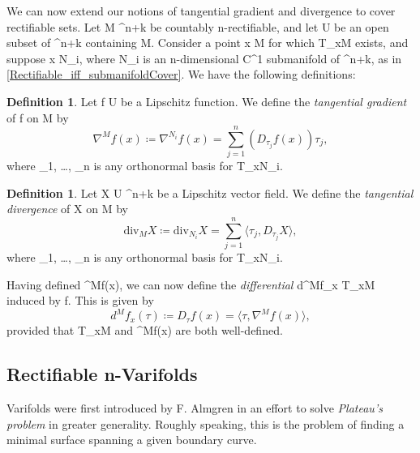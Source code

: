 \documentclass[a4paper, 11pt]{article}
\theoremstyle{plain}
\theoremstyle{definition}
\newtheorem{definition}[theorem]{Definition}
\theoremstyle{remark}
\renewcommand{\div}{\text{div}} %
\numberwithin{equation}{subsection}
\def\({}
\def\){}
\begin{document}
We can now extend our notions of tangential gradient and divergence to cover rectifiable sets. Let \(M \subset {}^{n+k}\) be countably \(n\)-rectifiable, and let \(U\) be an open subset of \(^{n+k}\) containing \(M\). Consider a point \(x \in M\) for which \(T_{x}M\) exists, and suppose \(x \in N_{i}\), where \(N_{i}\) is an \(n\)-dimensional \(C^1\) submanifold of \(^{n+k}\), as in \cref{Rectifiable_iff_submanifoldCover}. We have the following definitions:

\begin{definition}
Let \(f \vcentcolon U \rightarrow {}\) be a Lipschitz function. We define the \emph{tangential gradient} of \(f\) on \(M\) by
\begin{equation}
\nabla^{M}f(x) \coloneq \nabla^{N_i}f(x) = \sum_{j=1}^{n}(D_{\tau_{j}}f(x))\tau_{j},
\end{equation}
where \(\tau_{1}, \ldots, \tau_{n}\) is any orthonormal basis for \(T_{x}N_{i}\).
\end{definition}

\begin{definition}
Let \(X \vcentcolon U \rightarrow {}^{n+k}\) be a Lipschitz vector field. We define the \emph{tangential divergence} of \(X\) on \(M\) by
\begin{equation}
\div_{M}X \coloneq \div_{N_i}X = \sum_{j=1}^{n} \langle \tau_{j}, D_{\tau_{j}}X \rangle,
\end{equation}
where \(\tau_{1}, \ldots, \tau_{n}\) is any orthonormal basis for \(T_{x}N_{i}\). 
\end{definition}

Having defined \(\nabla^{M}f(x)\), we can now define the \emph{differential} \(d^{M}f_{x} \vcentcolon T_{x}M \rightarrow {}\) induced by \(f\). This is given by
\begin{equation}
d^{M}f_{x}(\tau) \coloneq D_{\tau}f(x) = \langle \tau, \nabla^{M}f(x) \rangle,
\end{equation}
provided that \(T_{x}M\) and \(\nabla^{M}f(x)\) are both well-defined.

\subsection{Rectifiable \(n\)-Varifolds}

Varifolds were first introduced by F. Almgren in an effort to solve \emph{Plateau's problem} in greater generality. Roughly speaking, this is the problem of finding a minimal surface spanning a given boundary curve.
\end{document}
